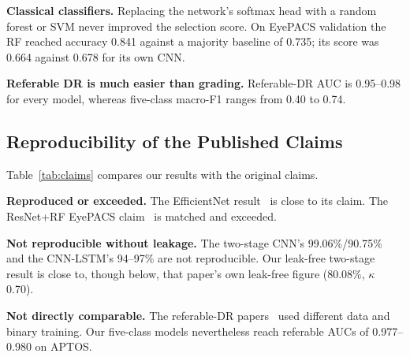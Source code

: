 \documentclass[journal]{IEEEtran}
\begin{document}
\textbf{Classical classifiers.} Replacing the network's softmax head with a random forest or SVM never
improved the selection score. On EyePACS validation the RF reached accuracy 0.841 against a majority
baseline of 0.735; its score was 0.664 against 0.678 for its own CNN.

\textbf{Referable DR is much easier than grading.} Referable-DR AUC is 0.95--0.98 for every model,
whereas five-class macro-F1 ranges from 0.40 to 0.74.

\subsection{Reproducibility of the Published Claims}
Table~\ref{tab:claims} compares our results with the original claims.

\textbf{Reproduced or exceeded.} The EfficientNet result~\cite{dixit2025effnet} is close to its
claim. The ResNet+RF EyePACS claim~\cite{yaqoob2021resnet} is matched and exceeded.

\textbf{Not reproducible without leakage.} The two-stage CNN's 99.06\%/90.75\% and the CNN-LSTM's
94--97\% are not reproducible. Our leak-free two-stage result is close to, though below, that paper's
own leak-free figure (80.08\%, $\kappa$ 0.70).

\textbf{Not directly comparable.} The referable-DR papers~\cite{gulshan2016development,papadopoulos2021mil}
used different data and binary training. Our five-class models nevertheless reach referable AUCs of
0.977--0.980 on APTOS.

\begin{table}[!t]
\caption{Published Claims vs.\ Leakage-Free Reproduction (APTOS Test Unless Noted)}
\label{tab:claims}
\centering
\footnotesize
\setlength{\tabcolsep}{2.5pt}
\end{table}
\end{document}
